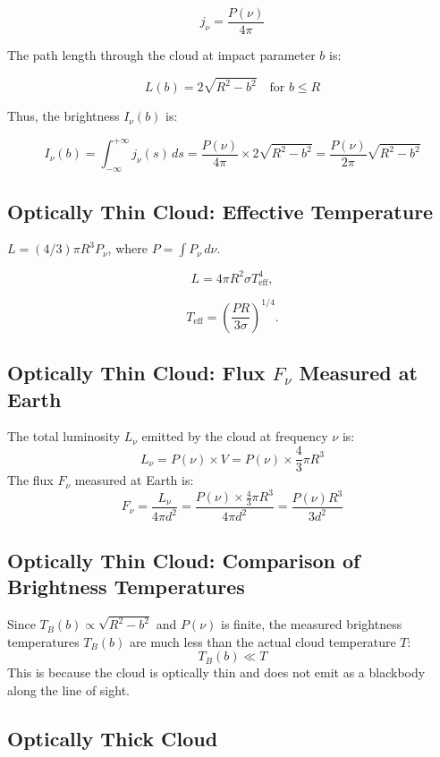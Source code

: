 \documentclass[12pt]{article}
\begin{document}
\[
    j_\nu = \frac{P(\nu)}{4\pi}
\]

The path length through the cloud at impact parameter \( b \) is:

\[
    L(b) = 2 \sqrt{R^2 - b^2} \quad \text{for } b \leq R
\]

Thus, the brightness \( I_\nu(b) \) is:

\[
    I_\nu(b) = \int_{-\infty}^{+\infty} j_\nu(s) \, ds = \frac{P(\nu)}{4\pi} \times 2 \sqrt{R^2 - b^2} = \frac{P(\nu)}{2\pi} \sqrt{R^2 - b^2}
\]

\subsection{Optically Thin Cloud: Effective Temperature}

\( L = (4/3) \pi R^3 P_\nu \), where \( P = \int P_\nu \, d\nu \).

\[
    L = 4 \pi R^2 \sigma T_{\text{eff}}^4,
\]

\[
    T_{\text{eff}} = \left( \frac{P R}{3 \sigma} \right)^{1/4}.
\]

\subsection{Optically Thin Cloud: Flux \( F_\nu \) Measured at Earth}

The total luminosity \( L_\nu \) emitted by the cloud at frequency \( \nu \) is:
\[
    L_\nu = P(\nu) \times V = P(\nu) \times \frac{4}{3} \pi R^3
\]
The flux \( F_\nu \) measured at Earth is:
\[
    F_\nu = \frac{L_\nu}{4\pi d^2} = \frac{P(\nu) \times \frac{4}{3} \pi R^3}{4\pi d^2} = \frac{P(\nu) R^3}{3 d^2}
\]

\subsection{Optically Thin Cloud: Comparison of Brightness Temperatures}

Since \( T_B(b) \propto \sqrt{R^2 - b^2} \) and \( P(\nu) \) is finite, the measured brightness temperatures \( T_B(b) \) are much less than the actual cloud temperature \( T \):
\[
    T_B(b) \ll T
\]
This is because the cloud is optically thin and does not emit as a blackbody along the line of sight.

\subsection{Optically Thick Cloud}
\end{document}
